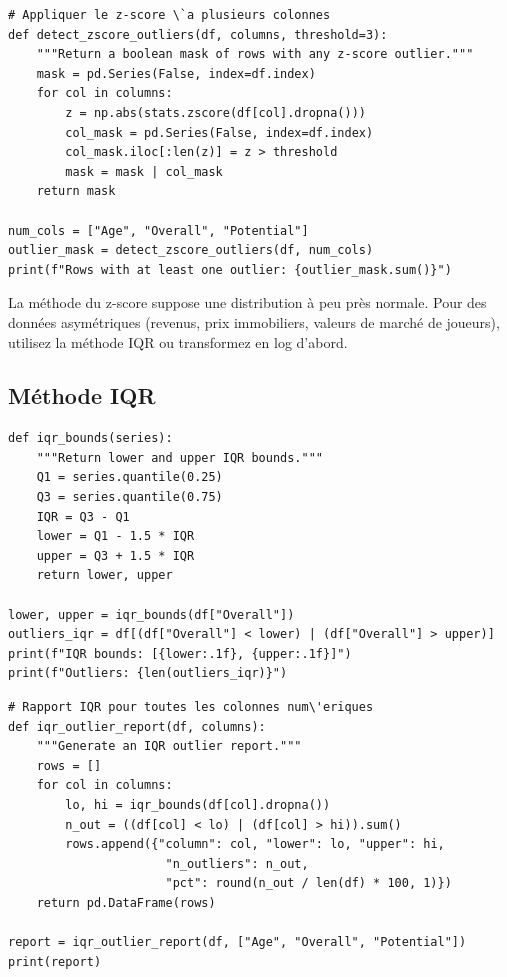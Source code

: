 \begin{verbatim}
# Appliquer le z-score \`a plusieurs colonnes
def detect_zscore_outliers(df, columns, threshold=3):
    """Return a boolean mask of rows with any z-score outlier."""
    mask = pd.Series(False, index=df.index)
    for col in columns:
        z = np.abs(stats.zscore(df[col].dropna()))
        col_mask = pd.Series(False, index=df.index)
        col_mask.iloc[:len(z)] = z > threshold
        mask = mask | col_mask
    return mask

num_cols = ["Age", "Overall", "Potential"]
outlier_mask = detect_zscore_outliers(df, num_cols)
print(f"Rows with at least one outlier: {outlier_mask.sum()}")
\end{verbatim}

\begin{datatip}
La m\'ethode du z-score suppose une distribution \`a peu pr\`es normale. Pour des donn\'ees asym\'etriques (revenus, prix immobiliers, valeurs de march\'e de joueurs), utilisez la m\'ethode IQR ou transformez en log d'abord.
\end{datatip}

\subsection{M\'ethode IQR}

\begin{verbatim}
def iqr_bounds(series):
    """Return lower and upper IQR bounds."""
    Q1 = series.quantile(0.25)
    Q3 = series.quantile(0.75)
    IQR = Q3 - Q1
    lower = Q1 - 1.5 * IQR
    upper = Q3 + 1.5 * IQR
    return lower, upper

lower, upper = iqr_bounds(df["Overall"])
outliers_iqr = df[(df["Overall"] < lower) | (df["Overall"] > upper)]
print(f"IQR bounds: [{lower:.1f}, {upper:.1f}]")
print(f"Outliers: {len(outliers_iqr)}")
\end{verbatim}

\begin{verbatim}
# Rapport IQR pour toutes les colonnes num\'eriques
def iqr_outlier_report(df, columns):
    """Generate an IQR outlier report."""
    rows = []
    for col in columns:
        lo, hi = iqr_bounds(df[col].dropna())
        n_out = ((df[col] < lo) | (df[col] > hi)).sum()
        rows.append({"column": col, "lower": lo, "upper": hi,
                      "n_outliers": n_out,
                      "pct": round(n_out / len(df) * 100, 1)})
    return pd.DataFrame(rows)

report = iqr_outlier_report(df, ["Age", "Overall", "Potential"])
print(report)
\end{verbatim}

